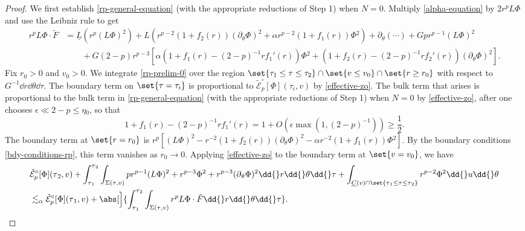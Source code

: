\documentclass[10pt, reqno]{amsart}
\begin{document}
\begin{proof}
 We first establish \cref{rp-general-equation} (with
the appropriate reductions of Step 1) when \(N = 0\).
Multiply \cref{alpha-equation} by \(2r^pL\Phi{}\) and use the Leibniz rule to get
\begin{equation}\label{rp-prelim-0}
\begin{split}
r^pL\Phi{}\cdot \tilde{F} &= \underline{L}(r^p(L\Phi{})^2) + L(r^{p-2}(1+f_2(r))(\partial{}_\theta{}\Phi{})^2 + \alpha{}r^{p-2}(1+f_1(r))\Phi{}^2) + \partial{}_\theta{}(\cdots{}) + Gpr^{p-1}(L\Phi{})^2 \\
&\qquad + G(2-p)r^{p-3}[\alpha{}(1+f_1(r) - (2-p)^{-1}rf_1'(r))\Phi{}^2 + (1+f_2(r) - (2-p)^{-1}rf_2'(r))(\partial{}_\theta{}\Phi{})^2].
\end{split}
\end{equation}
Fix \(r_0 > 0\) and \(v_0>0\). We integrate \cref{rp-prelim-0} over the region
\(\set{\tau_1\le \tau{}\le \tau_2}\cap \set{v\le v_0}\cap \set{r\ge r_0}\) with
respect to \(G^{-1}\dd{}r\dd{}\theta{}\dd{}\tau{}\). The boundary term on
\(\set{\tau{}=\tau_i}\) is proportional to
\(\tilde{\mathcal{E}}_{p}^{\circ }[\Phi{}](\tau{}_i,v)\) by \cref{effective-zo}. The bulk
term that arises is proportional to the bulk term in \cref{rp-general-equation}
(with the appropriate reductions of Step 1) when
\(N = 0\) by \cref{effective-zo}, after one chooses \(\epsilon{}\ll 2-p\le \eta{}_0\), so that
\begin{equation}
1 + f_1(r) - (2-p)^{-1}rf_1'(r) = 1 + O(\epsilon{}\max (1,(2-p)^{-1})) \ge \frac{1}{2}.
\end{equation}
The boundary
term at \(\set{r=r_0}\) is \(r^p[(L\Phi{})^2 -
r^{-2}(1+f_2(r))(\partial{}_\theta{}\Phi{})^2 - \alpha{}r^{-2}(1+f_1(r))\Phi{}^2]\). By the boundary conditions \cref{bdy-conditions-rp}, this term vanishes as
\(r_0\to 0\). Applying \cref{effective-zo} to the boundary term at
\(\set{v=v_0}\), we have
\begin{equation}\label{rp-general-N0-prep}
\begin{split}
&\tilde{\mathcal{E}}_{p}^{\circ }[\Phi{}](\tau{}_2,v) + \int_{\tau{}_1}^{\tau{}_2} \int _{\Sigma{}(\tau{},v)} pr^{p-1}(L\Phi{})^2 + r^{p-3}\Phi{}^2 + r^{p-3}(\partial{}_\theta{}\Phi{})^2\dd{}r\dd{}\theta{}\dd{}\tau{} + \int _{\underline{C}(v)\cap \set{\tau{}_1\le \tau{}\le \tau{}_2}} r^{p-2}\Phi^2\dd{}u\dd{}\theta{} \\
&\lesssim_{\alpha{}} \tilde{\mathcal{E}}_{p}^{\circ }[\Phi{}](\tau{}_1,v) + \abs[\Big]{\int_{\tau{}_1}^{\tau{}_2} \int _{\Sigma{}(\tau{},v)} r^pL\Phi{}\cdot \tilde{F}\dd{}r\dd{}\theta{}\dd{}\tau{}}.

\end{split}
\end{equation}
\end{proof}
\end{document}
